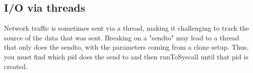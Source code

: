 \documentclass[titlepage]{article}
\begin{document}
\subsection{I/O via threads}
Network traffic is sometimes sent via a thread, making it challenging to track the source of the data that was sent.  Breaking on a "sendto" may
lead to a thread that only does the sendto, with the parameters coming from a clone setup.  Thus, you must find which pid does the send to and then
runToSyscall until that pid is created.
\end{document}
